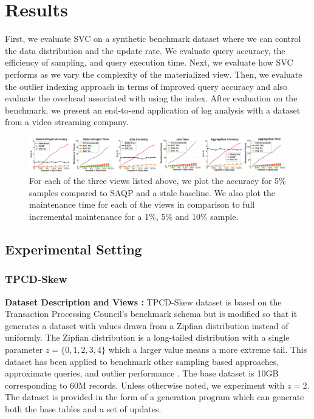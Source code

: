 \section{Results}
\label{exp}
First, we evaluate SVC on a synthetic benchmark dataset where we can control the data distribution and the update rate.
We evaluate query accuracy, the efficiency of sampling, and query execution time.
Next, we evaluate how SVC performs as we vary the complexity of the materialized view.
Then, we evaluate the outlier indexing approach in terms of improved query accuracy and also evaluate the overhead associated with using the index.
After evaluation on the benchmark, we present an end-to-end application of log analysis with a dataset from a video streaming company.

\begin{figure}[ht!]
\hspace{-5.5em}
 \includegraphics[scale=0.19]{exp/exp2-full.eps}
 \caption{For each of the three views listed above, we plot the accuracy for 5\% samples compared to SAQP and a stale baseline. We also plot the maintenance time for each of the views in comparison to full incremental maintenance for a 1\%, 5\% and 10\% sample. \label{exp2update} }
\end{figure}

\subsection{Experimental Setting}
\subsubsection{TPCD-Skew}
{\noindent \bf Dataset Description and Views :}
TPCD-Skew dataset \cite{tpcdskew} is based on the Transaction Processing Council's benchmark
schema but is modified so that it generates a dataset with values drawn from a Zipfian distribution instead of uniformly.
The Zipfian distribution \cite{mitzenmacher2004brief} is a long-tailed distribution with a single parameter $z=\{0,1,2,3,4\}$ which a larger
value means a more extreme tail.
This dataset has been applied to benchmark other sampling based approaches, approximate queries, and outlier performance \cite{chaudhuri2001overcoming, agrawal2005database}.
The base dataset is 10GB corresponding to 60M records.
Unless otherwise noted, we experiment with $z=2$.
The dataset is provided in the form of a generation program which can generate both the base tables and a set of updates.

